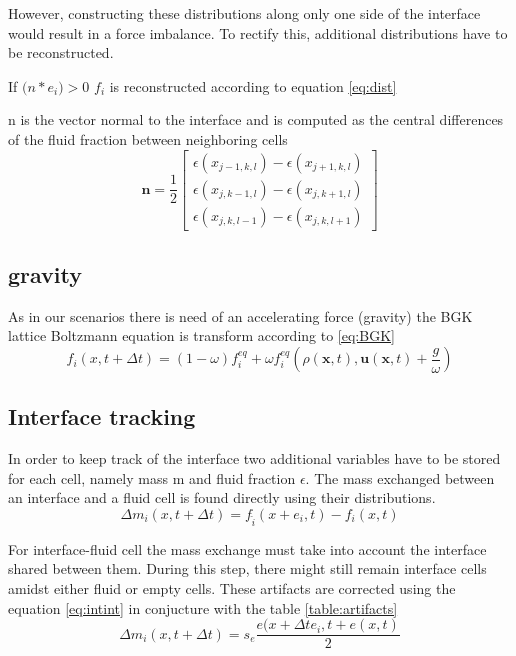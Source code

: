 \documentclass[10pt,a4paper,notitlepage]{article}
\begin{document}
However, constructing these distributions along only one side of the interface would result in a force imbalance. To rectify this, additional distributions have to be reconstructed.

If $\mathbf(n*e_{i})>0$
$f_{i}$ is reconstructed according to equation \eqref{eq:dist}

n is the vector normal to the interface and is computed as the central differences of the fluid fraction between neighboring cells
\begin{equation} \label{eq:normal}
\mathbf{n}=\frac{1}{2}\begin{bmatrix} \epsilon(x_{j-1,k,l})-\epsilon(x_{j+1,k,l})\\\epsilon(x_{j,k-1,l})-\epsilon(x_{j,k+1,l})\\\epsilon(x_{j,k,l-1})-\epsilon(x_{j,k,l+1} ) \end{bmatrix}
\end{equation}

\subsection{gravity }
As in our scenarios there is need of an accelerating force (gravity) the BGK lattice Boltzmann equation is transform according to \eqref{eq:BGK}\cite{thurey2006optimization}
\begin{equation} \label{eq:BGK}
f_{i}(x,t+\Delta t)=(1-\omega)f_{i}^{eq}+\omega f_{i}^{eq}(\rho(\mathbf{x},t),\mathbf{u}(\mathbf{x},t)+\frac{g}{\omega})
\end{equation}
\subsection{Interface tracking}
In order to keep track of the interface two additional variables have to be stored for each cell, namely mass m and fluid fraction $\epsilon$. The mass exchanged between an interface and a fluid cell  is found directly using their distributions. 
\begin{equation} \label{eq:fluid-interface}
\Delta m_{i}(x,t+\Delta t)=f_{\hat{i}}(x+e_{i},t)-f_{i}(x,t)
\end{equation}

For interface-fluid cell the mass exchange must take into account the interface shared between them. During this step, there might still remain interface cells amidst either fluid or empty cells. These artifacts are corrected using the equation \eqref{eq:intint} in conjucture with the table \ref{table:artifacts}
\begin{equation} \label{eq:intint}
\Delta m_{i}(x,t+\Delta t)=s_{e} \frac{e(x+\Delta te_{i},t+e(x,t)}{2}
\end{equation}
\end{document}
